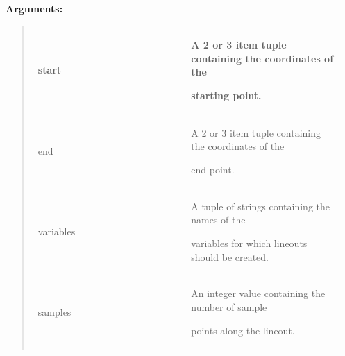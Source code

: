 \documentclass[letterpaper,10pt,english]{sphinxmanual}
\begin{document}
\begin{DUlineblock}{0em}
\item[] 
\item[] \textbf{Arguments:}
\end{DUlineblock}
\begin{quote}

\begin{tabular}{|p{0.475\linewidth}|p{0.475\linewidth}|}
\hline

start
 & 
\begin{DUlineblock}{0em}
\item[] A 2 or 3 item tuple containing the coordinates of the
\item[] starting point.
\end{DUlineblock}
\\
\hline
end
 & 
\begin{DUlineblock}{0em}
\item[] A 2 or 3 item tuple containing the coordinates of the
\item[] end point.
\end{DUlineblock}
\\
\hline
variables
 & 
\begin{DUlineblock}{0em}
\item[] A tuple of strings containing the names of the
\item[] variables for which lineouts should be created.
\end{DUlineblock}
\\
\hline
samples
 & 
\begin{DUlineblock}{0em}
\item[] An integer value containing the number of sample
\item[] points along the lineout.
\end{DUlineblock}
\\
\hline\end{tabular}

\end{quote}
\end{document}
